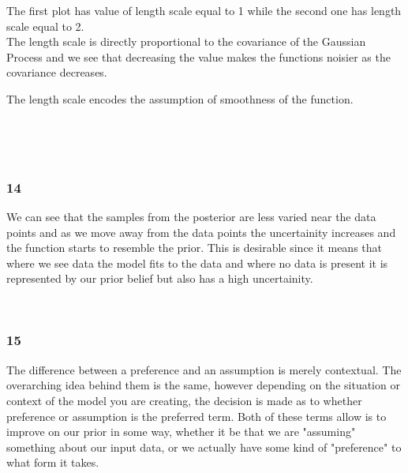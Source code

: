 \documentclass[11pt]{article}
\begin{document}
The first plot has value of length scale equal to 1 while the second one
has length scale equal to 2.\\
The length scale is directly proportional to the covariance of the
Gaussian Process and we see that decreasing the value makes the
functions noisier as the covariance decreases.

The length scale encodes the assumption of smoothness of the function.
    \begin{center}
    \end{center}
    { \hspace*{\fill} \\}

    \begin{center}
    \end{center}
    { \hspace*{\fill} \\}

    \subsubsection*{14}\label{section}

We can see that the samples from the posterior are less varied near the
data points and as we move away from the data points the uncertainity
increases and the function starts to resemble the prior. This is
desirable since it means that where we see data the model fits to the
data and where no data is present it is represented by our prior belief
but also has a high uncertainity.
    \begin{center}
    \end{center}
    { \hspace*{\fill} \\}

    \subsubsection*{15}\label{section}

The difference between a preference and an assumption is merely
contextual. The overarching idea behind them is the same, however
depending on the situation or context of the model you are creating, the
decision is made as to whether preference or assumption is the preferred
term. Both of these terms allow is to improve on our prior in some way,
whether it be that we are "assuming" something about our input data, or
we actually have some kind of "preference" to what form it takes.
\end{document}
